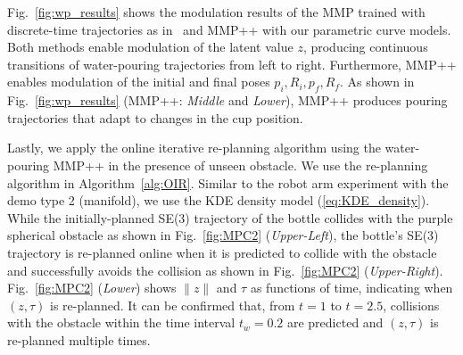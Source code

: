 Fig.~\ref{fig:wp_results} shows the modulation results of the MMP trained with discrete-time trajectories as in~\cite{lee2023equivariant} and MMP++ with our parametric curve models. 
Both methods enable modulation of the latent value $z$, producing continuous transitions of water-pouring trajectories from left to right. 
Furthermore, MMP++ enables modulation of the initial and final poses $p_i,R_i,p_f,R_f$. As shown in Fig.~\ref{fig:wp_results} (MMP++: {\it Middle} and {\it Lower}), MMP++ produces pouring trajectories that adapt to changes in the cup position.

Lastly, we apply the online iterative re-planning algorithm using the water-pouring MMP++ in the presence of unseen obstacle. We use the re-planning algorithm in Algorithm~\ref{alg:OIR}. 
Similar to the robot arm experiment with the demo type 2 (manifold), we use the KDE density model (\ref{eq:KDE_density}). 
While the initially-planned SE(3) trajectory of the bottle collides with the purple spherical obstacle as shown in Fig.~\ref{fig:MPC2} ({\it Upper-Left}), the bottle's SE(3) trajectory is re-planned online when it is predicted to collide with the obstacle and successfully avoids the collision as shown in Fig.~\ref{fig:MPC2} ({\it Upper-Right}). Fig.~\ref{fig:MPC2} ({\it Lower}) shows $\|z\|$ and $\tau$ as functions of time, indicating when $(z,\tau)$ is re-planned. It can be confirmed that, from $t=1$ to $t=2.5$, collisions with the obstacle within the time interval $t_w=0.2$ are predicted and $(z, \tau)$ is re-planned multiple times. 


